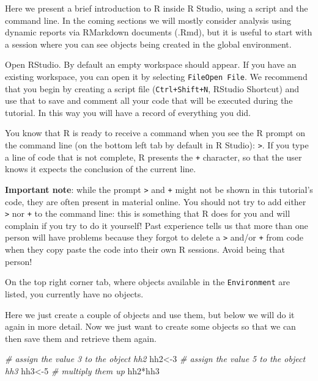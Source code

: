 \documentclass[
]{article}
\newenvironment{Shaded}{\begin{snugshade}}{\end{snugshade}}
\newcommand{\CommentTok}[1]{\textcolor[rgb]{0.56,0.35,0.01}{\textit{#1}}}
\newcommand{\DecValTok}[1]{\textcolor[rgb]{0.00,0.00,0.81}{#1}}
\newcommand{\NormalTok}[1]{#1}
\newcommand{\OtherTok}[1]{\textcolor[rgb]{0.56,0.35,0.01}{#1}}
\newcommand{\SpecialCharTok}[1]{\textcolor[rgb]{0.00,0.00,0.00}{#1}}
\begin{document}
Here we present a brief introduction to R inside R Studio, using a
script and the command line. In the coming sections we will mostly
consider analysis using dynamic reports via RMarkdown documents (.Rmd),
but it is useful to start with a session where you can see objects being
created in the global environment.

Open RStudio. By default an empty workspace should appear. If you have
an existing workspace, you can open it by selecting
\texttt{File\textbar{}Open\ File}. We recommend that you begin by
creating a script file (\texttt{Ctrl+Shift+N}, RStudio Shortcut) and use
that to save and comment all your code that will be executed during the
tutorial. In this way you will have a record of everything you did.

You know that R is ready to receive a command when you see the R prompt
on the command line (on the bottom left tab by default in R Studio):
\texttt{\textgreater{}}. If you type a line of code that is not
complete, R presents the \texttt{+} character, so that the user knows it
expects the conclusion of the current line.

\textbf{Important note}: while the prompt \texttt{\textgreater{}} and
\texttt{+} might not be shown in this tutorial's code, they are often
present in material online. You should not try to add either
\texttt{\textgreater{}} nor \texttt{+} to the command line: this is
something that R does for you and will complain if you try to do it
yourself! Past experience tells us that more than one person will have
problems because they forgot to delete a \texttt{\textgreater{}} and/or
\texttt{+} from code when they copy paste the code into their own R
sessions. Avoid being that person!

On the top right corner tab, where objects available in the
\texttt{Environment} are listed, you currently have no objects.

Here we just create a couple of objects and use them, but below we will
do it again in more detail. Now we just want to create some objects so
that we can then save them and retrieve them again.

\begin{Shaded}
\begin{Highlighting}[]
\CommentTok{\# assign the value 3 to the object hh2}
\NormalTok{hh2}\OtherTok{\textless{}{-}}\DecValTok{3}
\CommentTok{\# assign the value 5 to the object hh3}
\NormalTok{hh3}\OtherTok{\textless{}{-}}\DecValTok{5}
\CommentTok{\# multiply them up}
\NormalTok{hh2}\SpecialCharTok{*}\NormalTok{hh3}
\end{Highlighting}
\end{Shaded}
\end{document}

